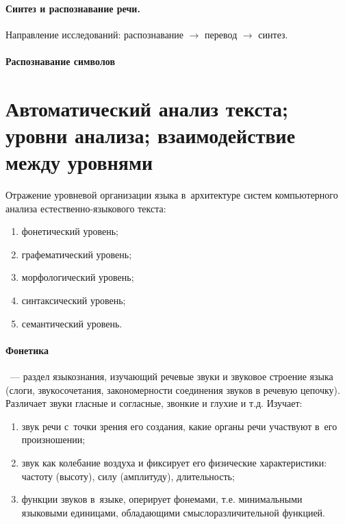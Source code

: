 \documentclass[12pt]{article}
\theoremstyle{definition}
\theoremstyle{remark}
\numberwithin{equation}{section}
\begin{document}
\paragraph{Синтез и распознавание речи.}
Направление исследований: распознавание $\rightarrow$ перевод 
$\rightarrow$ синтез. 
\paragraph{Распознавание символов}

\section{Автоматический анализ текста; уровни анализа; взаимодействие 
между уровнями}
Отражение уровневой организации языка в~архитектуре систем 
компьютерного анализа естественно-языкового текста:
\begin{enumerate}[label=---]
    \item фонетический уровень;
    \item графематический уровень;
    \item морфологический уровень;
    \item синтаксический уровень;
    \item семантический уровень.
\end{enumerate}

\paragraph{Фонетика}~--- раздел языкознания, изучающий речевые 
звуки и звуковое строение языка (слоги, звукосочетания, закономерности 
соединения звуков в речевую цепочку). Различает звуки гласные 
и согласные, звонкие и глухие и т.д. Изучает:
\begin{enumerate}[label=---]
    \item звук речи с~точки зрения его создания, какие органы речи 
    участвуют в~его произношении;
    \item звук как колебание воздуха и фиксирует его физические 
    характеристики: частоту (высоту), силу (амплитуду), длительность;
    \item функции звуков в~языке, оперирует фонемами, т.е. 
    минимальными языковыми единицами, обладающими смыслоразличительной 
    функцией.
\end{enumerate}
\end{document}
